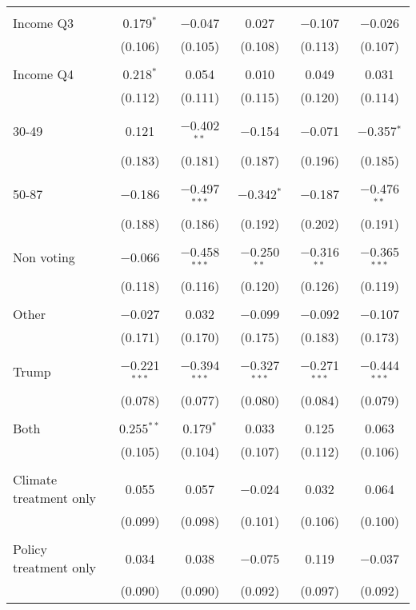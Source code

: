 \begin{tabular}{@{\extracolsep{5pt}}lccccc}
  & & & & & \\ 
 Income Q3 & 0.179$^{*}$ & $-$0.047 & 0.027 & $-$0.107 & $-$0.026 \\ 
  & (0.106) & (0.105) & (0.108) & (0.113) & (0.107) \\ 
  & & & & & \\ 
 Income Q4 & 0.218$^{*}$ & 0.054 & 0.010 & 0.049 & 0.031 \\ 
  & (0.112) & (0.111) & (0.115) & (0.120) & (0.114) \\ 
  & & & & & \\ 
 30-49 & 0.121 & $-$0.402$^{**}$ & $-$0.154 & $-$0.071 & $-$0.357$^{*}$ \\ 
  & (0.183) & (0.181) & (0.187) & (0.196) & (0.185) \\ 
  & & & & & \\ 
 50-87 & $-$0.186 & $-$0.497$^{***}$ & $-$0.342$^{*}$ & $-$0.187 & $-$0.476$^{**}$ \\ 
  & (0.188) & (0.186) & (0.192) & (0.202) & (0.191) \\ 
  & & & & & \\ 
 Non voting & $-$0.066 & $-$0.458$^{***}$ & $-$0.250$^{**}$ & $-$0.316$^{**}$ & $-$0.365$^{***}$ \\ 
  & (0.118) & (0.116) & (0.120) & (0.126) & (0.119) \\ 
  & & & & & \\ 
 Other & $-$0.027 & 0.032 & $-$0.099 & $-$0.092 & $-$0.107 \\ 
  & (0.171) & (0.170) & (0.175) & (0.183) & (0.173) \\ 
  & & & & & \\ 
 Trump & $-$0.221$^{***}$ & $-$0.394$^{***}$ & $-$0.327$^{***}$ & $-$0.271$^{***}$ & $-$0.444$^{***}$ \\ 
  & (0.078) & (0.077) & (0.080) & (0.084) & (0.079) \\ 
  & & & & & \\ 
 Both & 0.255$^{**}$ & 0.179$^{*}$ & 0.033 & 0.125 & 0.063 \\ 
  & (0.105) & (0.104) & (0.107) & (0.112) & (0.106) \\ 
  & & & & & \\ 
 Climate treatment only & 0.055 & 0.057 & $-$0.024 & 0.032 & 0.064 \\ 
  & (0.099) & (0.098) & (0.101) & (0.106) & (0.100) \\ 
  & & & & & \\ 
 Policy treatment only & 0.034 & 0.038 & $-$0.075 & 0.119 & $-$0.037 \\ 
  & (0.090) & (0.090) & (0.092) & (0.097) & (0.092) \\ 

\end{tabular}
